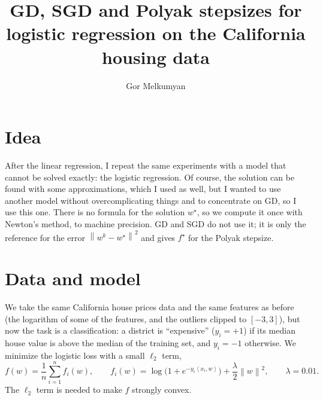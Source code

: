 \documentclass[11pt,a4paper]{article}
\title{GD, SGD and Polyak stepsizes for logistic regression on the California housing data}
\author{Gor Melkumyan}
\date{}
\newcommand{\norm}[1]{\left\| #1 \right\|}
\newcommand{\ip}[2]{\left\langle #1, #2 \right\rangle}
\begin{document}
\maketitle

\section*{Idea}

After the linear regression, I repeat the same experiments with a model that cannot be solved exactly: the
logistic regression. Of course, the solution can be found with some approximations, which I used as well, but I
wanted to use another model without overcomplicating things and to concentrate on GD, so I use this one.
There is no formula for the solution $w^\star$, so we compute it once with Newton's method, to machine precision. GD and SGD do not use it; it is only the reference for the error
$\norm{w^k - w^\star}^2$ and gives $f^\star$ for the Polyak stepsize.

\section*{Data and model}

We take the same California house prices data and the same features as before (the logarithm of some of the
features, and the outliers clipped to $[-3, 3]$), but now the task is a classification: a district is
``expensive'' ($y_i = +1$) if its median house value is above the median of the training set, and $y_i = -1$
otherwise. We minimize the logistic loss with a small $\ell_2$ term,
\[
  f(w) = \frac{1}{n}\sum_{i=1}^n f_i(w), \qquad
  f_i(w) = \log\bigl(1 + e^{-y_i\ip{x_i}{w}}\bigr) + \frac{\lambda}{2}\norm{w}^2, \qquad \lambda = 0.01 .
\]
The $\ell_2$ term is needed to make $f$ strongly convex.
\end{document}
